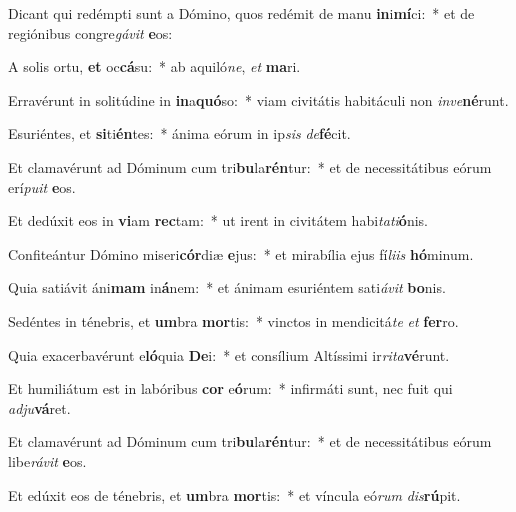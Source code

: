 \item Dicant qui redémpti sunt a Dómino, quos redémit de manu \textbf{in}i\textbf{mí}ci:~* et de regiónibus congre\textit{gá}\textit{vit} \textbf{e}os:
\item A solis ortu, \textbf{et} oc\textbf{cá}su:~* ab aquiló\textit{ne}, \textit{et} \textbf{ma}ri.
\item Erravérunt in solitúdine in \textbf{in}a\textbf{quó}so:~* viam civitátis habitáculi non \textit{in}\textit{ve}\textbf{né}runt.
\item Esuriéntes, et \textbf{si}ti\textbf{én}tes:~* ánima eórum in ip\textit{sis} \textit{de}\textbf{fé}cit.
\item Et clamavérunt ad Dóminum cum tri\textbf{bu}la\textbf{rén}tur:~* et de necessitátibus eórum erí\textit{pu}\textit{it} \textbf{e}os.
\item Et dedúxit eos in \textbf{vi}am \textbf{rec}tam:~* ut irent in civitátem habi\textit{ta}\textit{ti}\textbf{ó}nis.
\item Confiteántur Dómino miseri\textbf{cór}diæ \textbf{e}jus:~* et mirabília ejus fí\textit{li}\textit{is} \textbf{hó}minum.
\item Quia satiávit áni\textbf{mam} in\textbf{á}nem:~* et ánimam esuriéntem sati\textit{á}\textit{vit} \textbf{bo}nis.
\item Sedéntes in ténebris, et \textbf{um}bra \textbf{mor}tis:~* vinctos in mendicitá\textit{te} \textit{et} \textbf{fer}ro.
\item Quia exacerbavérunt e\textbf{ló}quia \textbf{De}i:~* et consílium Altíssimi ir\textit{ri}\textit{ta}\textbf{vé}runt.
\item Et humiliátum est in labóribus \textbf{cor} e\textbf{ó}rum:~* infirmáti sunt, nec fuit qui \textit{ad}\textit{ju}\textbf{vá}ret.
\item Et clamavérunt ad Dóminum cum tri\textbf{bu}la\textbf{rén}tur:~* et de necessitátibus eórum libe\textit{rá}\textit{vit} \textbf{e}os.
\item Et edúxit eos de ténebris, et \textbf{um}bra \textbf{mor}tis:~* et víncula eó\textit{rum} \textit{dis}\textbf{rú}pit.
